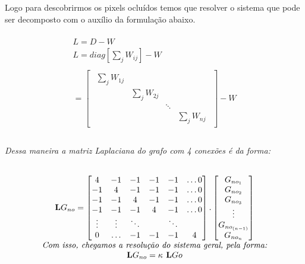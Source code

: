 Logo para descobrirmos os pixels ocluídos temos que resolver o sistema que pode ser decomposto com o auxílio da formulação abaixo.



\[
\begin{matrix}

\\
L = D - W \\
L = diag\left [  \sum_{j}W_{ij} \right ] - W\\
\\
= \begin{bmatrix}
\begin{matrix}
\sum_jW_{1j} &    & \\
  &  \sum_jW_{2j} &  & \\
  &  & \ddots & \\
  &          & & \sum_jW_{nj} 
\end{matrix}
\end{bmatrix}

- W
\\[6pt]
\\[6pt]

\end{matrix}
\]

\textit{Dessa maneira a matriz Laplaciana do grafo com 4 conexões é da forma:} %

\[
\begin{matrix}

\\
\textbf{L}G_{no}=\begin{bmatrix}
\begin{matrix}
4 &  -1  & -1 &-1 &-1 &\ldots 0\\
-1  &  4 & -1 &-1 &-1 &\ldots  0\\
-1  &-1  &4   &-1 &-1 &\ldots0\\
-1  &-1  &-1   &4 &-1 &\ldots0\\
\vdots & \vdots & \ddots &  &\ddots\\
0  &   \ldots&-1 & -1 &-1    &4
\end{matrix}
\end{bmatrix}
.
\begin{bmatrix}
\begin{matrix}
G_{no_1} \\
G_{no_2}  \\
G_{no_3} \\
$\vdots$\\
G_{no_{(n-1)}} \\
G_{no_n}  \\
\end{matrix}
\end{bmatrix}
\\%
\textit{Com isso, chegamos a resolução do sistema geral, pela forma:} 
\\%
\textbf{L}G_{no} = \kappa\textbf{ L}G{o}
\end{matrix}
\]

